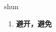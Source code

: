 
\begin{frame}
{\huge shun}
\begin{center}
\begin{enumerate}\Large
  \item \textbf{避开，避免}
\end{enumerate}
\end{center}
\end{frame}
